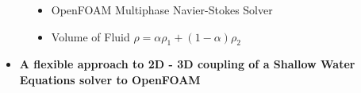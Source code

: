 \begin{frame}
\begin{figure}
\begin{minipage}{0.1\linewidth}
\end{minipage}
\begin{minipage}{0.15\linewidth}
\begin{tcolorbox}[title=\centering interFoam\\3D, colframe=TUMOrange,
colback=TUMOrange!30] 
\addtolength{\leftmargini}{-1.5em}
\begin{itemize}
\setlength{\itemsep}{5ex}
\vspace{0.5cm}
\item OpenFOAM Multiphase Navier-Stokes Solver
\item Volume of Fluid $\rho=\alpha\rho_1 + (1-\alpha)\rho_2$
\end{itemize}
\end{tcolorbox}
\end{minipage}
\end{figure}

\begin{minipage}{1\textwidth}
\begin{itemize}
\addtolength{\itemindent}{-1em} 
\item<2->[] \begin{tcolorbox}[colframe=TUMGreen,
colback=TUMGreen!30] 
\centering
\textbf{A flexible approach to 2D - 3D coupling of a Shallow Water Equations solver to OpenFOAM}
\end{tcolorbox}
\end{itemize}
\end{minipage}

\end{frame}

















%
